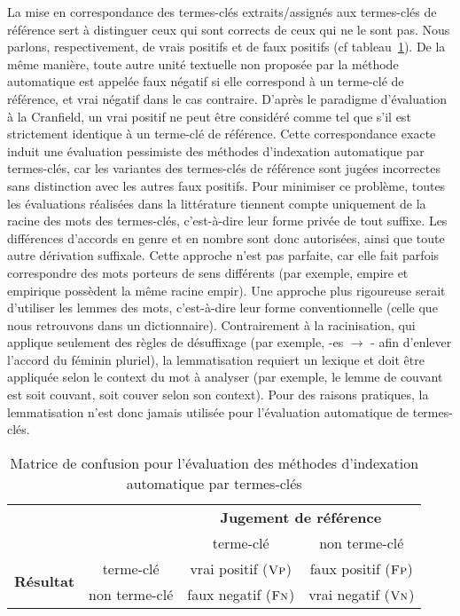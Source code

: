     La mise en correspondance des termes-clés extraits/assignés aux termes-clés
    de référence sert à distinguer ceux qui sont corrects de ceux qui ne le sont
    pas. Nous parlons, respectivement, de vrais positifs et de faux positifs (cf
    tableau~\ref{tab:confusion_matrix}). De la même manière, toute autre unité
    textuelle non proposée par la méthode automatique est appelée faux négatif
    si elle correspond à un terme-clé de référence, et vrai négatif dans le cas
    contraire. D'après le paradigme d'évaluation \og{}à la Cranfield\fg{}, un
    vrai positif ne peut être considéré comme tel que s'il est strictement
    identique à un terme-clé de référence. Cette correspondance \og{}exacte\fg{}
    induit une évaluation pessimiste des méthodes d'indexation automatique par
    termes-clés, car les variantes des termes-clés de référence sont jugées
    incorrectes sans distinction avec les autres faux positifs. Pour minimiser
    ce problème, toutes les évaluations réalisées dans la littérature tiennent
    compte uniquement de la racine des mots des termes-clés, c'est-à-dire leur
    forme privée de tout suffixe. Les différences d'accords en genre et en
    nombre sont donc autorisées, ainsi que toute autre dérivation suffixale.
    Cette approche n'est pas parfaite, car elle fait parfois correspondre des
    mots porteurs de sens différents (par exemple, \og{}empire\fg{} et
    \og{}empirique\fg{} possèdent la même racine \og{}empir\fg{}). Une approche
    plus rigoureuse serait d'utiliser les lemmes des mots, c'est-à-dire leur
    forme conventionnelle (celle que nous retrouvons dans  un dictionnaire).
    Contrairement à la racinisation, qui applique seulement des règles de
    désuffixage (par exemple, -es $\rightarrow$ - afin d'enlever l'accord du
    féminin pluriel), la lemmatisation requiert un lexique et doit être
    appliquée selon le context du mot à analyser (par exemple, le lemme de
    \og{}couvant\fg{} est soit \og{}couvant\fg{}, soit \og{}couver\fg{} selon
    son context). Pour des raisons pratiques, la lemmatisation n'est donc jamais
    utilisée pour l'évaluation automatique de termes-clés.
    \begin{table}
      \begin{center}
        \begin{tabular}{cc|cc}
          \toprule
          \multicolumn{2}{c|}{} & \multicolumn{2}{c}{\textbf{Jugement de référence}}\\
          \multicolumn{2}{c|}{} & \og{}terme-clé\fg{} & \og{}non terme-clé\fg{}\\
          \hline
          \multirow{2}{*}{\textbf{Résultat}} & \og{}terme-clé\fg{} & vrai positif ($\textsc{Vp}$) & faux positif ($\textsc{Fp}$)\\
          & \og{}non terme-clé\fg{} & faux negatif ($\textsc{Fn}$) & vrai negatif ($\textsc{Vn}$)\\
          \bottomrule
        \end{tabular}
        \caption{Matrice de confusion pour l'évaluation des méthodes
                 d'indexation automatique par termes-clés
                \label{tab:confusion_matrix}}
      \end{center}
    \end{table}

